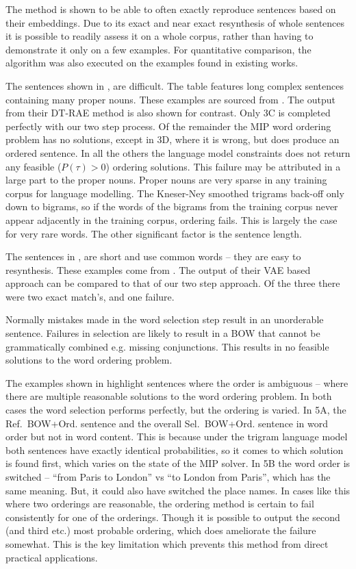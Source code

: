 \documentclass[11pt]{article}
\theoremstyle{plain}
\theoremstyle{definition}
\newcommand{\textcite}{\protect\newcite}
\newcommand{\oracletitle}{Ref.~BOW+Ord.}
\newcommand{\twosteptitle}{Sel.~BOW+Ord.}
\begin{document}
The method is shown to be able to often exactly reproduce sentences based on their embeddings.  Due to its exact and near exact resynthesis of whole sentences it is possible to readily assess it on a whole corpus, rather than having to demonstrate it only on a few examples. For quantitative comparison, the algorithm was also executed on the examples found in existing works.


The sentences shown in , are difficult. The table features long complex sentences containing many proper nouns. These examples are sourced from \textcite{iyyer2014generating}. The output from their DT-RAE method is also shown for contrast. Only 3C is completed perfectly with our two step process. Of the remainder the MIP word ordering problem has no solutions, except in 3D, where it is wrong, but does produce an ordered sentence. In all the others the language model constraints does not return any feasible ($P(\tau)>0$) ordering solutions. This failure may be attributed in a large part to the proper nouns.  Proper nouns are very sparse in any training corpus for language modelling. The Kneser-Ney smoothed trigrams back-off only down to bigrams, so if the words of the bigrams from the training corpus never appear adjacently in the training corpus, ordering fails. This is largely the case for very rare words. The other significant factor is the sentence length.

The sentences in , are short and use common words -- they are easy to resynthesis. These examples come from \textcite{Bowman2015SmoothGeneration}. The output of their VAE based approach can be compared to that of our two step approach. Of the three there were two exact match's, and one failure.

Normally mistakes made in the word selection step result in an unorderable sentence. Failures in selection are likely to result in a BOW that cannot be grammatically combined e.g. missing conjunctions. This results in no feasible solutions to the word ordering problem.

The examples shown in  highlight sentences where the order is ambiguous -- where there are multiple reasonable solutions to the word ordering problem. In both cases the word selection performs perfectly, but the ordering is varied. In 5A, the \oracletitle{} sentence and the overall \twosteptitle{} sentence  in word order but not in word content. This is because under the trigram language model both sentences have exactly identical probabilities, so it comes to which solution is found first, which varies on the state of the MIP solver. In 5B the word order is switched -- ``from Paris to London'' vs ``to London from Paris'', which has the same meaning. But, it could also have switched the place names. In cases like this where two orderings are reasonable, the ordering method is certain to fail consistently for one of the orderings. Though it is possible to output the second (and third etc.) most probable ordering, which does ameliorate the failure somewhat. This is the key limitation which prevents this method from direct practical applications.
\end{document}
